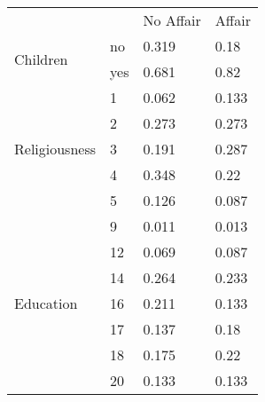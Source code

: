 \begin{table}[ht]
\centering
\begin{tabular}{llll}
  \toprule 
 & & No Affair & Affair \\ 
 \multirow{2}{*}{Children} & no & 0.319 & 0.18 \\ 
     & yes & 0.681 & 0.82 \\ 
  \multirow{5}{*}{Religiousness} & 1 & 0.062 & 0.133 \\ 
    & 2 & 0.273 & 0.273 \\ 
    & 3 & 0.191 & 0.287 \\ 
    & 4 & 0.348 & 0.22 \\ 
    & 5 & 0.126 & 0.087 \\ 
  \multirow{7}{*}{Education} & 9 & 0.011 & 0.013 \\ 
    & 12 & 0.069 & 0.087 \\ 
    & 14 & 0.264 & 0.233 \\ 
    & 16 & 0.211 & 0.133 \\ 
    & 17 & 0.137 & 0.18 \\ 
    & 18 & 0.175 & 0.22 \\ 
    & 20 & 0.133 & 0.133 \\ 
   \bottomrule 
\end{tabular}
\end{table}
